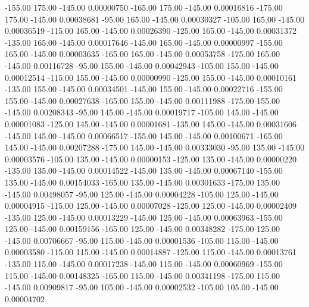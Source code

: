    -155.00    175.00   -145.00     0.00000750
   -165.00    175.00   -145.00     0.00016816
   -175.00    175.00   -145.00     0.00038681
    -95.00    165.00   -145.00     0.00030327
   -105.00    165.00   -145.00     0.00036519
   -115.00    165.00   -145.00     0.00026390
   -125.00    165.00   -145.00     0.00031372
   -135.00    165.00   -145.00     0.00017646
   -145.00    165.00   -145.00     0.00000997
   -155.00    165.00   -145.00     0.00003635
   -165.00    165.00   -145.00     0.00053758
   -175.00    165.00   -145.00     0.00116728
    -95.00    155.00   -145.00     0.00042943
   -105.00    155.00   -145.00     0.00012514
   -115.00    155.00   -145.00     0.00000990
   -125.00    155.00   -145.00     0.00010161
   -135.00    155.00   -145.00     0.00034501
   -145.00    155.00   -145.00     0.00022716
   -155.00    155.00   -145.00     0.00027638
   -165.00    155.00   -145.00     0.00111988
   -175.00    155.00   -145.00     0.00208343
    -95.00    145.00   -145.00     0.00019717
   -105.00    145.00   -145.00     0.00001083
   -125.00    145.00   -145.00     0.00001681
   -135.00    145.00   -145.00     0.00031606
   -145.00    145.00   -145.00     0.00066517
   -155.00    145.00   -145.00     0.00100671
   -165.00    145.00   -145.00     0.00207288
   -175.00    145.00   -145.00     0.00333030
    -95.00    135.00   -145.00     0.00003576
   -105.00    135.00   -145.00     0.00000153
   -125.00    135.00   -145.00     0.00000220
   -135.00    135.00   -145.00     0.00014522
   -145.00    135.00   -145.00     0.00067140
   -155.00    135.00   -145.00     0.00154033
   -165.00    135.00   -145.00     0.00301633
   -175.00    135.00   -145.00     0.00498057
    -95.00    125.00   -145.00     0.00004228
   -105.00    125.00   -145.00     0.00004915
   -115.00    125.00   -145.00     0.00007028
   -125.00    125.00   -145.00     0.00002409
   -135.00    125.00   -145.00     0.00013229
   -145.00    125.00   -145.00     0.00063963
   -155.00    125.00   -145.00     0.00159156
   -165.00    125.00   -145.00     0.00348282
   -175.00    125.00   -145.00     0.00706667
    -95.00    115.00   -145.00     0.00001536
   -105.00    115.00   -145.00     0.00003580
   -115.00    115.00   -145.00     0.00014887
   -125.00    115.00   -145.00     0.00013761
   -135.00    115.00   -145.00     0.00017238
   -145.00    115.00   -145.00     0.00060969
   -155.00    115.00   -145.00     0.00148325
   -165.00    115.00   -145.00     0.00341198
   -175.00    115.00   -145.00     0.00909817
    -95.00    105.00   -145.00     0.00002532
   -105.00    105.00   -145.00     0.00004702
